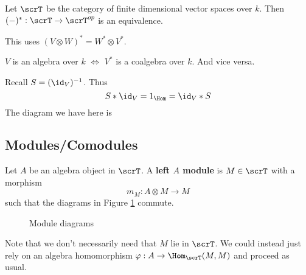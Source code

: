 \documentclass[12pt]{article}
\begin{document}
 \begin{lem}
	Let $\scrT$ be the category of finite dimensional vector spaces over $k$.
	Then $(-)^*:\scrT\to\scrT^{op}$ is an equivalence.
 \end{lem}
 This uses $(V\otimes W)^*=W^*\otimes V^*$.
 \begin{cor}
	$V$ is an algebra over $k$ $\Leftrightarrow$ $V^*$ is a coalgebra over $k$.
	And vice versa.
 \end{cor}

 Recall $S=(\id_V)^{-1}$. Thus
 \[S\ast \id_V=1_{\Hom}=\id_V\ast S\]
 The diagram we have here is
 \begin{figure}[h]
	 \centering
 \end{figure}

 \subsection*{Modules/Comodules}
 \begin{defn}
	Let $A$ be an algebra object in $\scrT$. A \textbf{left $A$ module} is $M\in\scrT$
	with a morphism
	\[m_M:A\otimes M\to M\]
	such that the diagrams in Figure \ref{fig-mod} commute.
\end{defn}
\begin{figure}[h]\label{fig-mod}
	\centering
	\caption{Module diagrams}
\end{figure}
\begin{rmk}
	Note that we don't necessarily need that $M$ lie in $\scrT$. We could instead just 
	rely on an algebra homomorphism $\varphi:A\to \Hom_{\scrT}(M,M)$ and proceed as usual.
\end{rmk}
\end{document}
